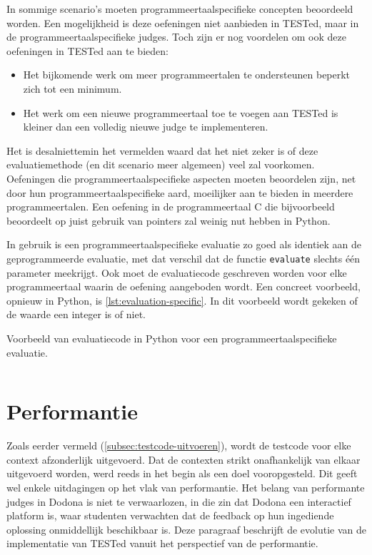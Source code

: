 In sommige scenario's moeten programmeertaalspecifieke concepten beoordeeld worden.
Een mogelijkheid is deze oefeningen niet aanbieden in TESTed, maar in de programmeertaalspecifieke judges.
Toch zijn er nog voordelen om ook deze oefeningen in TESTed aan te bieden:
\begin{itemize}
    \item Het bijkomende werk om meer programmeertalen te ondersteunen beperkt zich tot een minimum.
    \item Het werk om een nieuwe programmeertaal toe te voegen aan TESTed is kleiner dan een volledig nieuwe judge te implementeren.
\end{itemize}
Het is desalniettemin het vermelden waard dat het niet zeker is of deze evaluatiemethode (en dit scenario meer algemeen) veel zal voorkomen.
Oefeningen die programmeertaalspecifieke aspecten moeten beoordelen zijn, net door hun programmeertaalspecifieke aard, moeilijker aan te bieden in meerdere programmeertalen.
Een oefening in de programmeertaal C die bijvoorbeeld beoordeelt op juist gebruik van pointers zal weinig nut hebben in Python.

In gebruik is een programmeertaalspecifieke evaluatie zo goed als identiek aan de geprogrammeerde evaluatie, met dat verschil dat de functie \texttt{evaluate} slechts één parameter meekrijgt.
Ook moet de evaluatiecode geschreven worden voor elke programmeertaal waarin de oefening aangeboden wordt.
Een concreet voorbeeld, opnieuw in Python, is \cref{lst:evaluation-specific}.
In dit voorbeeld wordt gekeken of de waarde een integer is of niet.

\begin{listing}
    \caption{Voorbeeld van evaluatiecode in Python voor een programmeertaalspecifieke evaluatie.}
    \label{lst:evaluation-specific}
    \inputminted{python}{code/evaluator-specific.py}
\end{listing}

\section{Performantie}\label{sec:performantie}

Zoals eerder vermeld (\cref{subsec:testcode-uitvoeren}), wordt de testcode voor elke context afzonderlijk uitgevoerd.
Dat de contexten strikt onafhankelijk van elkaar uitgevoerd worden, werd reeds in het begin als een doel vooropgesteld.
Dit geeft wel enkele uitdagingen op het vlak van performantie.
Het belang van performante judges in Dodona is niet te verwaarlozen, in die zin dat Dodona een interactief platform is, waar studenten verwachten dat de feedback op hun ingediende oplossing onmiddellijk beschikbaar is.
Deze paragraaf beschrijft de evolutie van de implementatie van TESTed vanuit het perspectief van de performantie.


